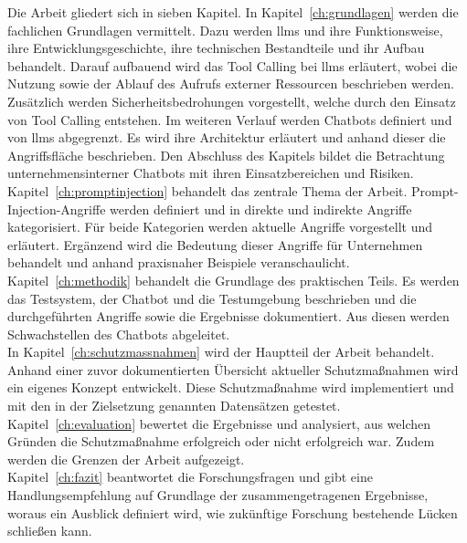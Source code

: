 Die Arbeit gliedert sich in sieben Kapitel. In Kapitel~\ref{ch:grundlagen} werden die fachlichen Grundlagen vermittelt. Dazu werden \acp{llm} und ihre Funktionsweise, 
ihre Entwicklungsgeschichte, ihre technischen Bestandteile und ihr Aufbau behandelt. 
Darauf aufbauend wird das Tool Calling bei \acp{llm} erläutert, wobei die Nutzung sowie der Ablauf des Aufrufs externer Ressourcen beschrieben werden. Zusätzlich werden 
Sicherheitsbedrohungen vorgestellt, welche durch den Einsatz von Tool Calling 
entstehen. Im weiteren Verlauf werden Chatbots definiert und von \acp{llm} abgegrenzt. Es wird ihre Architektur erläutert und anhand dieser die Angriffsfläche beschrieben.
Den Abschluss des Kapitels bildet die Betrachtung unternehmensinterner Chatbots mit ihren Einsatzbereichen und Risiken. \\
Kapitel~\ref{ch:promptinjection} behandelt das zentrale Thema der Arbeit. Prompt-Injection-Angriffe werden definiert und in direkte und indirekte Angriffe kategorisiert.
Für beide Kategorien werden aktuelle Angriffe vorgestellt und erläutert. Ergänzend wird die Bedeutung dieser Angriffe für Unternehmen behandelt und anhand
praxisnaher Beispiele veranschaulicht. \\
Kapitel~\ref{ch:methodik} behandelt die Grundlage des praktischen Teils. Es werden das Testsystem, der Chatbot und die Testumgebung beschrieben und die durchgeführten Angriffe 
sowie die Ergebnisse dokumentiert. Aus diesen werden Schwachstellen des Chatbots abgeleitet. \\
In Kapitel~\ref{ch:schutzmassnahmen} wird der Hauptteil der Arbeit behandelt. Anhand einer zuvor dokumentierten Übersicht aktueller Schutzmaßnahmen wird ein 
eigenes Konzept entwickelt. Diese Schutzmaßnahme wird implementiert und mit den in der Zielsetzung genannten Datensätzen getestet. \\
Kapitel~\ref{ch:evaluation} bewertet die Ergebnisse und analysiert, aus welchen Gründen die Schutzmaßnahme erfolgreich oder nicht
erfolgreich war. Zudem werden die Grenzen der Arbeit aufgezeigt. \\
Kapitel~\ref{ch:fazit} beantwortet die Forschungsfragen und gibt eine Handlungsempfehlung auf Grundlage der zusammengetragenen Ergebnisse, woraus ein Ausblick definiert wird, 
wie zukünftige Forschung bestehende Lücken schließen kann.